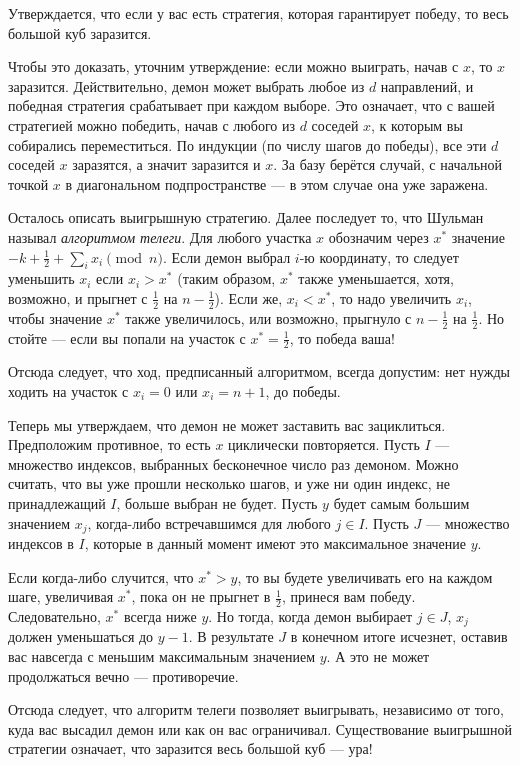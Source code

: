 Утверждается, что если у вас есть стратегия, которая гарантирует победу, то весь большой куб заразится.

Чтобы это доказать, уточним утверждение: если можно выиграть, начав с $x$, то $x$ заразится.
Действительно, демон может выбрать любое из $d$ направлений,
и победная стратегия срабатывает при каждом выборе.
Это означает, что с вашей стратегией можно победить, начав с любого из $d$ соседей $x$, к которым вы собирались переместиться.
По индукции (по числу шагов до победы), все эти $d$ соседей $x$ заразятся, а значит заразится и $x$.
За базу берётся случай, с начальной точкой $x$ в диагональном подпространстве --- в этом случае она уже заражена.

Осталось описать выигрышную стратегию.
Далее последует то, что Шульман называл \emph{алгоритмом телеги}.
Для любого участка $x$ обозначим через $x^*$ значение $-k + \tfrac12 + \sum_i x_i \pmod n$.
Если демон выбрал $i$-ю координату, то следует уменьшить $x_i$ если $x_i > x^*$ (таким образом, $x^*$ также уменьшается, хотя, возможно, и прыгнет с $\tfrac12$ на $n - \tfrac12$).
Если же, $x_i < x^*$, то надо увеличить $x_i$, чтобы значение $x^*$ также увеличилось, или возможно, прыгнуло с $n - \tfrac12$ на $\tfrac12$.
Но стойте --- если вы попали на участок с $x^* = \tfrac12$, то победа ваша!

Отсюда следует, что ход, предписанный алгоритмом, всегда допустим:
нет нужды ходить на участок с $x_i = 0$ или $x_i = n + 1$, до победы.

Теперь мы утверждаем, что демон не может заставить вас зациклиться.
Предположим противное, то есть $x$ циклически повторяется.
Пусть $I$ --- множество индексов, выбранных бесконечное число раз демоном.
Можно считать, что вы уже прошли несколько шагов, и уже ни один индекс, не принадлежащий $I$, больше выбран не будет.
Пусть $y$ будет самым большим значением $x_j$, когда-либо встречавшимся для любого $j \in I$.
Пусть $J$ --- множество индексов в $I$, которые в данный момент имеют это максимальное значение $y$.

Если когда-либо случится, что $x^* > y$, то вы будете увеличивать его на каждом шаге, увеличивая $x^*$, пока он не прыгнет в $\tfrac12$, принеся вам победу.
Следовательно, $x^*$ всегда ниже $y$.
Но тогда, когда демон выбирает $j \in J$, $x_j$ должен уменьшаться до $y - 1$.
В результате $J$ в конечном итоге исчезнет, оставив вас навсегда с меньшим максимальным значением $y$.
А это не может продолжаться вечно --- противоречие.

Отсюда следует, что алгоритм телеги позволяет выигрывать, независимо от того, куда вас высадил демон или как он вас ограничивал.
Существование выигрышной стратегии означает, что заразится весь большой куб --- ура!

